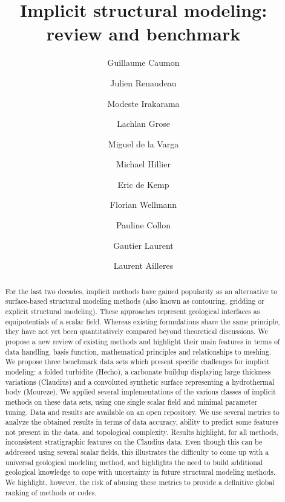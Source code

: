 \documentclass[preprint]{ring20}
\title{Implicit structural modeling: review and benchmark}
\author[1]{Guillaume Caumon}
\author[1,2]{Julien Renaudeau}
\author[1]{Modeste Irakarama}
\author[3]{Lachlan Grose}
\author[5]{Miguel de la Varga}
\author[6]{Michael Hillier}
\author[6]{Eric de Kemp}
\author[5]{Florian Wellmann}
\author[1]{Pauline Collon}
\author[4]{Gautier Laurent}
\author[3]{Laurent Ailleres}
\affil[1]{RING, GeoRessources / ENSG, Universit\'e de Lorraine / CNRS, France}
\affil[2]{Schlumberger, France}
\affil[3]{Monash University, Australia}
\affil[4]{Univ. Orl\'eans, CNRS, BRGM, ISTO, France}
\affil[5]{RWTH Aachen, Germany}
\affil[6]{NRCan, Canada}
\begin{document}
\maketitle

\begin{abstract}

For the last two decades, implicit methods have gained popularity as 
an alternative to surface-based structural modeling methods (also known as 
contouring, gridding or explicit structural modeling). These approaches represent 
geological interfaces as equipotentials of a scalar field. 
Whereas existing formulations share the same principle, they have not yet been 
quantitatively compared beyond theoretical discussions. We propose a new review 
 of existing methods and highlight their main features in terms 
of data handling, basis function, mathematical principles and relationships to 
meshing. We propose three benchmark data sets which present specific 
challenges for implicit modeling: a folded turbidite (Hecho), a carbonate buildup 
displaying large thickness variations (Claudius) and a convoluted synthetic surface 
representing a hydrothermal body (Moureze). We applied several implementations of the 
various classes of implicit methods on these data sets, using one single scalar field and minimal parameter 
tuning. Data and results are available on an open repository. We use several metrics to analyze 
the obtained results in terms of data accuracy, ability to predict 
some features not present in the data, and topological complexity. 
Results highlight, for all methods, inconsistent stratigraphic features 
on the Claudius data. Even though this can be addressed using several scalar fields, 
this illustrates the difficulty to come up with a universal geological 
modeling method, and highlights the need to build additional geological 
knowledge to cope with uncertainty in future structural modeling methods.  
We highlight, however, the risk of abusing these metrics to provide a definitive 
global ranking of methods or codes. 

\end{abstract}


\end{document}
